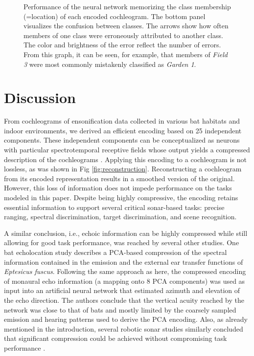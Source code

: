 \documentclass[10pt,letterpaper]{article}
\begin{document}
\begin{figure}[tb]
	\centering
	\caption{Performance of the neural network memorizing the class membership (=location) of each encoded cochleogram. The bottom panel visualizes the confusion between classes. The arrows show how often members of one class were erroneously attributed to another class. The color and brightness of the error reflect the number of errors. From this graph, it can be seen, for example, that members of \textit{Field 3} were most commonly mistakenly classified as \textit{Garden 1}.}
	\label{fig:categorization}
\end{figure}

\section*{Discussion}

From cochleograms of ensonification data collected in various bat habitats and indoor environments, we derived an efficient encoding based on 25 independent components. These independent components can be conceptualized as neurons with particular spectrotemporal receptive fields whose output yields a compressed description of the cochleograms \cite{Mely2017}. Applying this encoding to a cochleogram is not lossless, as was shown in Fig \ref{fig:reconstruction}. Reconstructing a cochleogram from its encoded representation results in a smoothed version of the original. However, this loss of information does not impede performance on the tasks modeled in this paper. Despite being highly compressive, the encoding retains essential information to support several critical sonar-based tasks: precise ranging, spectral discrimination, target discrimination, and scene recognition. 

A similar conclusion, i.e., echoic information can be highly compressed while still allowing for good task performance, was reached by several other studies. One bat echolocation study \cite{Wotton1997} describes a PCA-based compression of the spectral information contained in the emission and the external ear transfer functions of \emph{Eptesicus fuscus}. Following the same approach as here, the compressed encoding of monaural echo information (a mapping onto 8 PCA components) was used as input into an artificial neural network that estimated azimuth and elevation of the echo direction. The authors conclude that the vertical acuity reached by the network was close to that of bats and mostly limited by the coarsely sampled emission and hearing patterns used to derive the PCA encoding. Also, as already mentioned in the introduction, several robotic sonar studies similarly concluded that significant compression could be achieved without compromising task performance \cite{Kuc1997b,Vanderelst2015a,Mansour2019,Mansour2019a}. 
\end{document}
